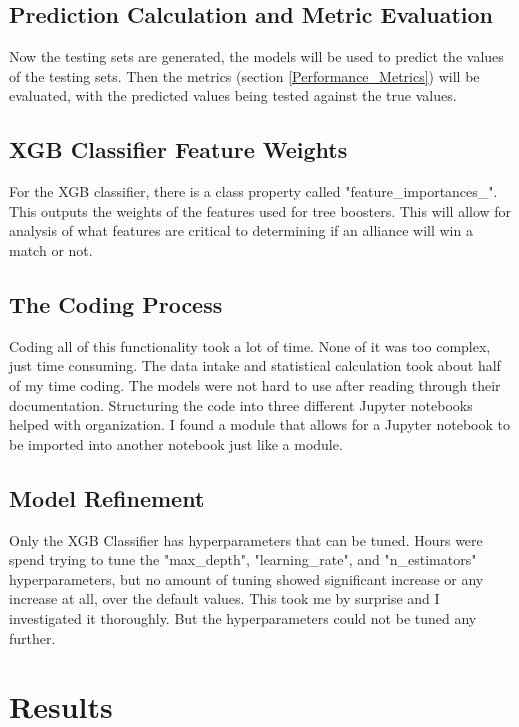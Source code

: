 \documentclass{article}
\begin{document}
\subsection{Prediction Calculation and Metric Evaluation}
\par
Now the testing sets are generated, the models will be used to predict the values of the testing sets. Then the metrics (section \ref{Performance_Metrics}) will be evaluated, with the predicted values being tested against the true values.

\subsection{XGB Classifier Feature Weights}
\par
For the XGB classifier, there is a class property called "feature\_importances\_". This outputs the weights of the features used for tree boosters. This will allow for analysis of what features are critical to determining if an alliance will win a match or not.

\subsection{The Coding Process}
\par
Coding all of this functionality took a lot of time. None of it was too complex, just time consuming. The data intake and statistical calculation took about half of my time coding. The models were not hard to use after reading through their documentation. Structuring the code into three different Jupyter notebooks helped with organization. I found a module that allows for a Jupyter notebook to be imported into another notebook just like a module.

\subsection{Model Refinement}
\par
Only the XGB Classifier has hyperparameters that can be tuned. Hours were spend trying to tune the "max\_depth", "learning\_rate", and "n\_estimators" hyperparameters, but no amount of tuning showed significant increase or any increase at all, over the default values. This took me by surprise and I investigated it thoroughly. But the hyperparameters could not be tuned any further.

\section{Results} \label{Results}
\end{document}
